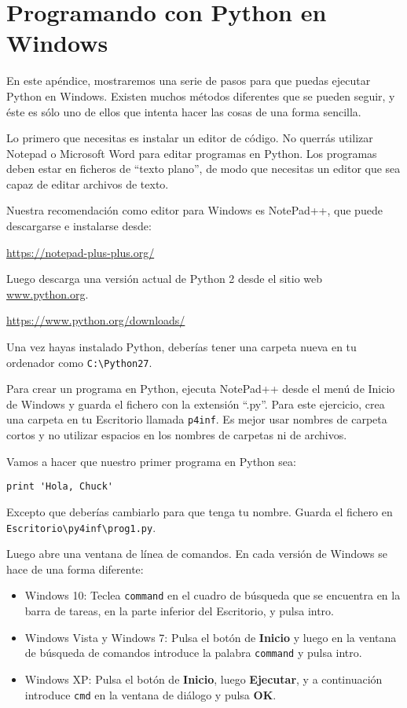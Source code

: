
\chapter{Programando con Python en Windows}

En este apéndice, mostraremos una serie de pasos
para que puedas ejecutar Python en Windows. Existen muchos métodos
diferentes que se pueden seguir, y éste es sólo uno de ellos
que intenta hacer las cosas de una forma sencilla.

Lo primero que necesitas es instalar un editor de código. No
querrás utilizar Notepad o Microsoft Word para editar
programas en Python. Los programas deben estar en ficheros de ``texto plano'',
de modo que necesitas un editor que sea capaz de
editar archivos de texto.

Nuestra recomendación como editor para Windows es NotePad++, que
puede descargarse e instalarse desde:

\url{https://notepad-plus-plus.org/}

Luego descarga una versión actual de Python 2 desde el
sitio web \url{www.python.org}.

\url{https://www.python.org/downloads/}

Una vez hayas instalado Python, deberías tener una
carpeta nueva en tu ordenador como {\tt C:{\textbackslash}Python27}.

Para crear un programa en Python, ejecuta NotePad++ desde el menú de Inicio de Windows
y guarda el fichero con la extensión ``.py''. Para este
ejercicio, crea una carpeta en tu Escritorio llamada
{\tt p4inf}. Es mejor usar nombres de carpeta cortos
y no utilizar espacios en los nombres de carpetas ni de archivos.

Vamos a hacer que nuestro primer programa en Python sea:

\beforeverb
\begin{verbatim}
print 'Hola, Chuck'
\end{verbatim}
\afterverb
%
Excepto que deberías cambiarlo para que tenga tu nombre. Guarda el fichero
en {\tt Escritorio{\textbackslash}py4inf{\textbackslash}prog1.py}.

Luego abre una ventana de línea de comandos. En cada versión de Windows
se hace de una forma diferente:

\begin{itemize}
\item Windows 10: Teclea {\tt command} en el cuadro de búsqueda
que se encuentra en la barra de tareas, en la parte inferior del Escritorio,
y pulsa intro.
	
\item Windows Vista y Windows 7: Pulsa el botón de {\bf Inicio}
y luego en la ventana de búsqueda de comandos introduce la palabra
{\tt command} y pulsa intro.

\item Windows XP: Pulsa el botón de {\bf Inicio}, luego {\bf Ejecutar}, y
a continuación introduce {\tt cmd} en la ventana de diálogo y pulsa {\bf OK}.
\end{itemize}

